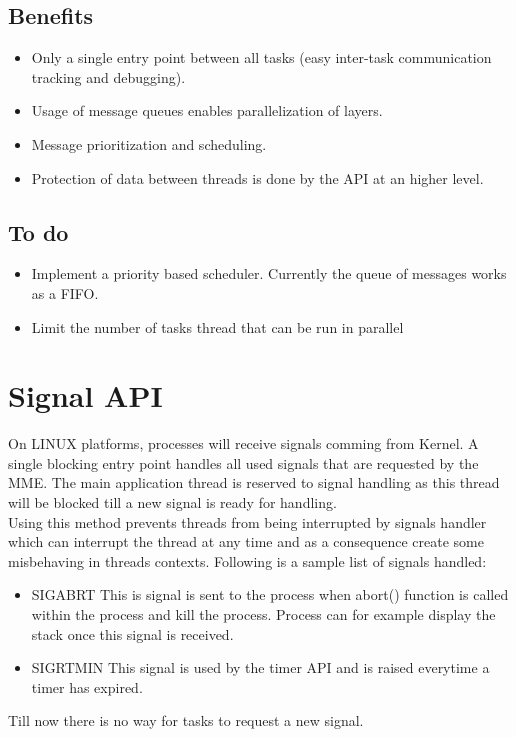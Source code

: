 \documentclass[a4paper,oneside]{report}
\begin{document}
\section{Benefits}
\begin{itemize}
 \item Only a single entry point between all tasks (easy inter-task communication tracking and debugging).
 \item Usage of message queues enables parallelization of layers.
 \item Message prioritization and scheduling.
 \item Protection of data between threads is done by the API at an higher level.
\end{itemize}

\section{To do}
\begin{itemize}
 \item Implement a priority based scheduler. Currently the queue of messages works as a FIFO.
 \item Limit the number of tasks thread that can be run in parallel
\end{itemize}

\chapter*{Signal API} 

On LINUX platforms, processes will receive signals comming from Kernel.
A single blocking entry point handles all used signals that are requested by the
MME. The main application thread is reserved to signal handling as this thread will
be blocked till a new signal is ready for handling.\\
Using this method prevents threads from being interrupted by signals handler which
can interrupt the thread at any time and as a consequence create some misbehaving
in threads contexts.
Following is a sample list of signals handled:
\begin{itemize}
 \item SIGABRT This is signal is sent to the process when abort() function is called
 within the process and kill the process. Process can for example display the stack
 once this signal is received.
 \item SIGRTMIN This signal is used by the timer API and is raised everytime a
 timer has expired.
\end{itemize}
Till now there is no way for tasks to request a new signal.
\end{document}
